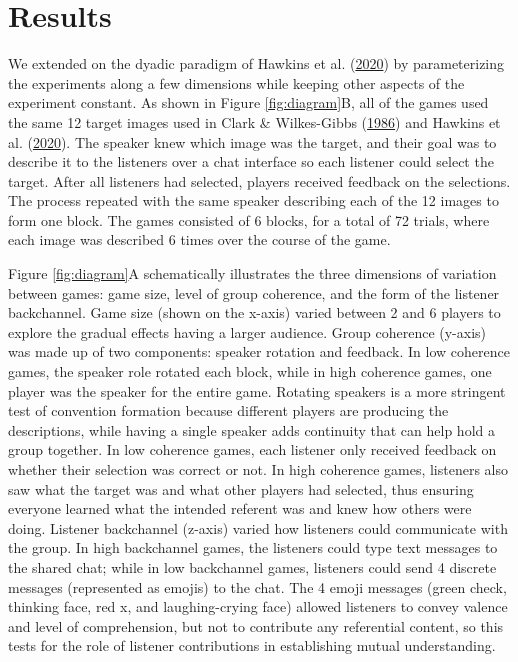\documentclass[
  english,
  a4paper,
]{article}
\begin{document}
\hypertarget{results}{%
\section{Results}\label{results}}

We extended on the dyadic paradigm of Hawkins et al. (\protect\hyperlink{ref-hawkinsCharacterizingDynamicsLearning2020}{2020}) by parameterizing the experiments along a few dimensions while keeping other aspects of the experiment constant. As shown in Figure \ref{fig:diagram}B, all of the games used the same 12 target images used in Clark \& Wilkes-Gibbs (\protect\hyperlink{ref-clarkReferringCollaborativeProcess1986}{1986}) and Hawkins et al. (\protect\hyperlink{ref-hawkinsCharacterizingDynamicsLearning2020}{2020}). The speaker knew which image was the target, and their goal was to describe it to the listeners over a chat interface so each listener could select the target. After all listeners had selected, players received feedback on the selections. The process repeated with the same speaker describing each of the 12 images to form one block. The games consisted of 6 blocks, for a total of 72 trials, where each image was described 6 times over the course of the game.

Figure \ref{fig:diagram}A schematically illustrates the three dimensions of variation between games: game size, level of group coherence, and the form of the listener backchannel. Game size (shown on the x-axis) varied between 2 and 6 players to explore the gradual effects having a larger audience. Group coherence (y-axis) was made up of two components: speaker rotation and feedback. In low coherence games, the speaker role rotated each block, while in high coherence games, one player was the speaker for the entire game. Rotating speakers is a more stringent test of convention formation because different players are producing the descriptions, while having a single speaker adds continuity that can help hold a group together. In low coherence games, each listener only received feedback on whether their selection was correct or not. In high coherence games, listeners also saw what the target was and what other players had selected, thus ensuring everyone learned what the intended referent was and knew how others were doing. Listener backchannel (z-axis) varied how listeners could communicate with the group. In high backchannel games, the listeners could type text messages to the shared chat; while in low backchannel games, listeners could send 4 discrete messages (represented as emojis) to the chat. The 4 emoji messages (green check, thinking face, red x, and laughing-crying face) allowed listeners to convey valence and level of comprehension, but not to contribute any referential content, so this tests for the role of listener contributions in establishing mutual understanding.
\end{document}
